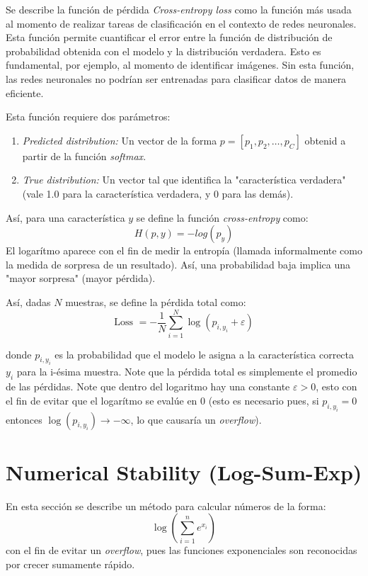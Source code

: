 \documentclass[12pt, letterpaper]{article}
\begin{document}
Se describe la función de pérdida \textit{Cross-entropy loss} como la función más usada al momento de 
realizar tareas de clasificación en el contexto de redes neuronales. Esta función permite cuantificar el error entre 
la función de distribución de probabilidad obtenida con el modelo y la distribución verdadera. Esto es fundamental, por ejemplo, al momento de 
identificar imágenes. Sin esta función, las redes neuronales no podrían ser entrenadas para clasificar datos de manera eficiente.

Esta función requiere dos parámetros: \begin{enumerate}
    \item \textit{Predicted distribution:} Un vector de la forma $p=[p_1, p_2, \dots, p_C]$ obtenid a partir de la función \textit{softmax}.
    \item \textit{True distribution:} Un vector tal que identifica la "característica verdadera" (vale 1.0 para la característica verdadera, y 0 para las demás).
\end{enumerate}

Así, para una característica $y$ se define la función \textit{cross-entropy} como: 
$$H(p,y)=-log(p_y)$$ El logarítmo aparece con el fin de medir la entropía (llamada informalmente como la medida de sorpresa de un resultado). Así, una probabilidad baja implica una "mayor sorpresa" (mayor pérdida).

Así, dadas $N$ muestras, se define la pérdida total como: 
$$\text{Loss } = -\frac{1}{N}\sum_{i=1}^N \log(p_{i,y_i}+\varepsilon)$$

donde $p_{i,y_i}$ es la probabilidad que el modelo le asigna a la característica correcta $y_i$ para la i-ésima muestra. Note que la pérdida total es simplemente el promedio de las pérdidas. 
Note que dentro del logaritmo hay una constante $\varepsilon>0$, esto con el fin de evitar que el logarítmo se evalúe en 0 (esto es necesario pues, si $p_{i,y_i}=0$ entonces $\log(p_{i,y_i})\rightarrow -\infty$, lo que causaría un \textit{overflow}).
 

\newpage

\section{Numerical Stability (Log-Sum-Exp)}

En esta sección se describe un método para calcular números de la forma: 
$$\log\left( \sum_{i=1}^n e^{x_i} \right)$$
con el fin de evitar un \textit{overflow}, pues las funciones exponenciales son reconocidas por crecer sumamente rápido.
\end{document}
